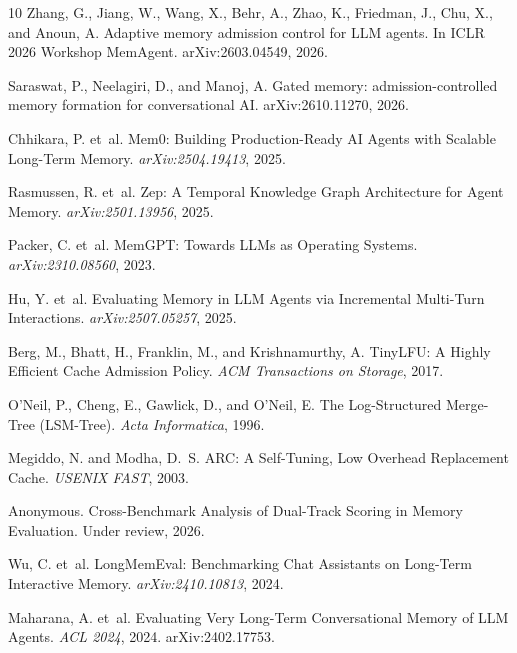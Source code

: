\documentclass[10pt,twocolumn]{article}
\begin{document}
\begin{thebibliography}{10}
Zhang, G., Jiang, W., Wang, X., Behr, A., Zhao, K., Friedman, J., Chu, X., and Anoun, A.
Adaptive memory admission control for LLM agents. In ICLR 2026 Workshop MemAgent.
arXiv:2603.04549, 2026.

Saraswat, P., Neelagiri, D., and Manoj, A. Gated memory: admission-controlled memory
formation for conversational AI. arXiv:2610.11270, 2026.


Chhikara, P. et~al.
\newblock Mem0: Building Production-Ready AI Agents with Scalable Long-Term Memory.
\newblock \emph{arXiv:2504.19413}, 2025.

Rasmussen, R. et~al.
\newblock Zep: A Temporal Knowledge Graph Architecture for Agent Memory.
\newblock \emph{arXiv:2501.13956}, 2025.

Packer, C. et~al.
\newblock MemGPT: Towards LLMs as Operating Systems.
\newblock \emph{arXiv:2310.08560}, 2023.

Hu, Y. et~al.
\newblock Evaluating Memory in LLM Agents via Incremental Multi-Turn Interactions.
\newblock \emph{arXiv:2507.05257}, 2025.

Berg, M., Bhatt, H., Franklin, M., and Krishnamurthy, A.
\newblock TinyLFU: A Highly Efficient Cache Admission Policy.
\newblock \emph{ACM Transactions on Storage}, 2017.

O'Neil, P., Cheng, E., Gawlick, D., and O'Neil, E.
\newblock The Log-Structured Merge-Tree (LSM-Tree).
\newblock \emph{Acta Informatica}, 1996.

Megiddo, N. and Modha, D.~S.
\newblock ARC: A Self-Tuning, Low Overhead Replacement Cache.
\newblock \emph{USENIX FAST}, 2003.

Anonymous. Cross-Benchmark Analysis of Dual-Track Scoring in Memory Evaluation. Under review, 2026.

Wu, C. et~al.
\newblock LongMemEval: Benchmarking Chat Assistants on Long-Term Interactive Memory.
\newblock \emph{arXiv:2410.10813}, 2024.

Maharana, A. et~al.
\newblock Evaluating Very Long-Term Conversational Memory of LLM Agents.
\newblock \emph{ACL 2024}, 2024. arXiv:2402.17753.



\end{thebibliography}
\end{document}
